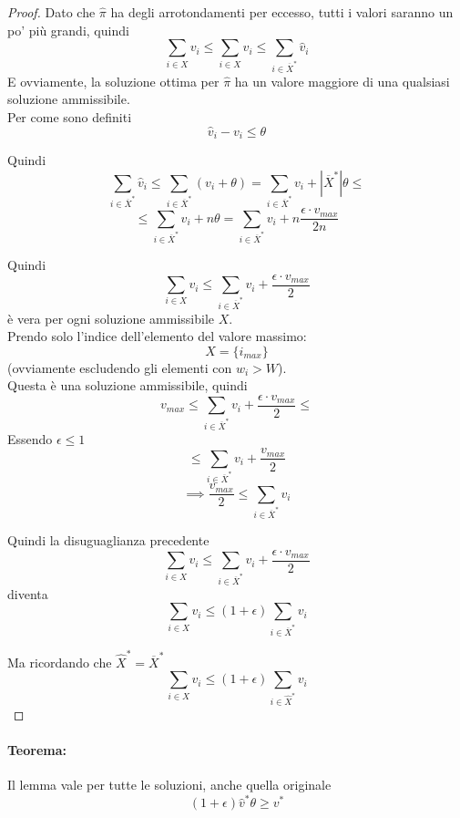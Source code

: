 \begin{proof}
	Dato che $\hat \pi$ ha degli arrotondamenti per eccesso, tutti i valori saranno un po' più grandi, quindi 
	$$ \sum_{i \in X} v_i \leq \sum_{i \in X} \hat v_i \leq \sum_{i \in \overline X^\ast} \hat v_i $$
	E ovviamente, la soluzione ottima per $\hat \pi$ ha un valore maggiore di una qualsiasi soluzione ammissibile.\\
	
	
	Per come sono definiti 
	$$\hat v_i - v_i \leq \theta $$
	
	Quindi 
	$$ \sum_{i \in \overline X^\ast} \hat v_i 
	\leq \sum_{i \in \overline X^\ast} (v_i + \theta) 
	= \sum_{i \in \overline X^\ast} v_i + |\overline X^\ast| \theta \leq $$
	$$\leq \sum_{i \in \overline X^\ast} v_i + n \theta 
	= \sum_{i \in \overline X^\ast} v_i + n \frac{\epsilon \cdot v_{max}}{2n}
	$$ 
	
	Quindi 
	$$ \sum_{i \in X} v_i \leq \sum_{i \in \overline X^\ast} v_i + \frac{\epsilon \cdot v_{max}}{2} $$
	è vera per ogni soluzione ammissibile $X$.\\
	
	Prendo solo l'indice dell'elemento del valore massimo:
	$$ X = \{i_{max}\}$$
	(ovviamente escludendo gli elementi con $w_i>W$).\\
	
	Questa è una soluzione ammissibile, quindi
	$$ v_{max} \leq \sum_{i \in \overline X^\ast} v_i + \frac{\epsilon \cdot v_{max}}{2} \leq  $$
	Essendo $\epsilon \leq 1$
	$$\leq  \sum_{i \in \overline X^\ast} v_i + \frac{v_{max}}{2}$$
	$$ \implies \frac{v_{max}}{2} \leq \sum_{i \in \overline X^\ast} v_i $$
	
	Quindi la disuguaglianza precedente
	$$ \sum_{i \in X} v_i \leq \sum_{i \in \overline X^\ast} v_i + \frac{\epsilon \cdot v_{max}}{2} $$
	diventa
	$$ \sum_{i \in X} v_i \leq (1 + \epsilon) \sum_{i \in \overline X^\ast} v_i$$
	
	Ma ricordando che $\hat X^\ast = \overline X^\ast$
	$$ \sum_{i \in X} v_i \leq (1 + \epsilon) \sum_{i \in \hat X^\ast} v_i $$
\end{proof}

\newpage

\paragraph{Teorema:} Il lemma vale per tutte le soluzioni, anche quella originale
$$(1 + \epsilon) \hat v^\ast \theta \geq v^\ast$$

